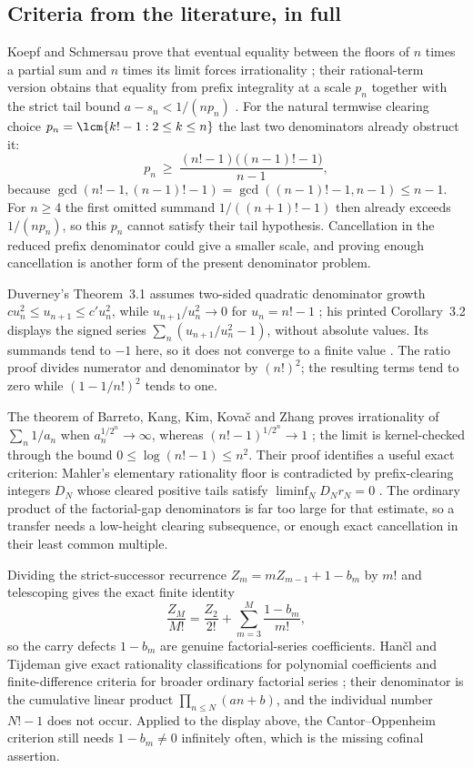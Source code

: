 \documentclass[11pt]{article}
\begin{document}
\subsection{Criteria from the literature, in full}\label{long68:sec:ext-literature}

Koepf and Schmersau prove that eventual equality between the floors of $n$
times a partial sum and $n$ times its limit forces irrationality
\cite[Thm.~1.1, p.~117]{koepf-schmersau}; their rational-term version obtains
that equality from prefix integrality at a scale $p_n$ together with the
strict tail bound $a-s_n<1/(np_n)$
\cite[Thms.~2.2--2.3, pp.~119--120]{koepf-schmersau}.  For the natural
termwise clearing choice $p_n=\lcm\{k!-1:2\le k\le n\}$ the last two
denominators already obstruct it:
\[
 p_n\ \ge\ \frac{(n!-1)\bigl((n-1)!-1\bigr)}{n-1},
\]
because $\gcd(n!-1,(n-1)!-1)=\gcd((n-1)!-1,n-1)\le n-1$.  For $n\ge4$ the
first omitted summand $1/((n+1)!-1)$ then already exceeds $1/(np_n)$, so this
$p_n$ cannot satisfy their tail hypothesis.  Cancellation in the reduced
prefix denominator could give a smaller scale, and proving enough
cancellation is another form of the present denominator problem.

Duverney's Theorem~3.1 assumes two-sided quadratic denominator growth
$cu_n^2\le u_{n+1}\le c'u_n^2$, while $u_{n+1}/u_n^2\to0$ for $u_n=n!-1$
\cite[pp.~275, 285--286]{duverney}; his printed Corollary~3.2 displays the
signed series $\sum_n(u_{n+1}/u_n^2-1)$, without absolute values.  Its
summands tend to $-1$ here, so it does not converge to a finite value
\cite[Cor.~3.2, p.~287]{duverney}.  The ratio proof divides numerator
and denominator by $(n!)^2$; the resulting terms tend to zero while
$(1-1/n!)^2$ tends to one.

The theorem of Barreto, Kang, Kim, Kova\v{c} and Zhang proves irrationality
of $\sum_n1/a_n$ when $a_n^{1/2^n}\to\infty$, whereas $(n!-1)^{1/2^n}\to1$
\cite[Thms.~2--3, pp.~2--4]{barreto-et-al}; the limit is kernel-checked
through the bound $0\le\log(n!-1)\le n^2$.  Their proof identifies a useful
exact criterion: Mahler's elementary rationality floor is contradicted by
prefix-clearing integers $D_N$ whose cleared positive tails satisfy
$\liminf_ND_Nr_N=0$ \cite[Lem.~8 and Prop.~12, pp.~6, 9--12]{barreto-et-al}.
The ordinary product of the factorial-gap denominators is far too large for
that estimate, so a transfer needs a low-height clearing subsequence, or
enough exact cancellation in their least common multiple.

Dividing the strict-successor recurrence $Z_m=mZ_{m-1}+1-b_m$ by $m!$ and
telescoping gives the exact finite identity
\[
 \frac{Z_M}{M!}=\frac{Z_2}{2!}+\sum_{m=3}^{M}\frac{1-b_m}{m!},
\]
so the carry defects $1-b_m$ are genuine factorial-series coefficients.
Han\v{c}l and Tijdeman give exact rationality classifications for polynomial
coefficients and finite-difference criteria for broader ordinary factorial
series \cite[Thm.~3.1 and Cor.~3.1, pp.~390--391]{hancl-tijdeman}; their
denominator is the cumulative linear product $\prod_{n\le N}(an+b)$, and the
individual number $N!-1$ does not occur.  Applied to the display above, the Cantor--Oppenheim criterion
still needs $1-b_m\ne0$ infinitely often, which is the missing cofinal
assertion.
\end{document}
